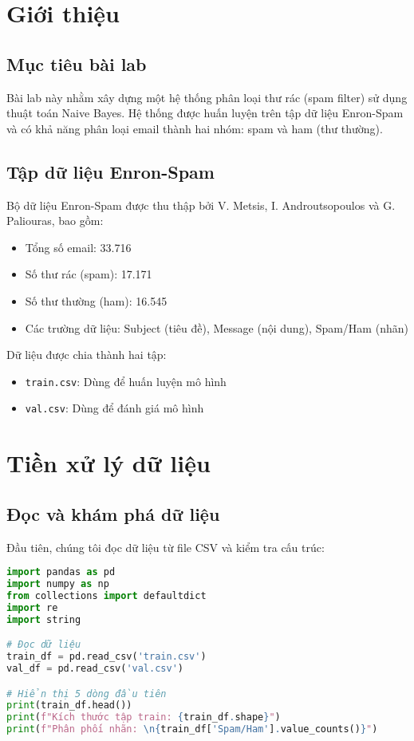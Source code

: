 \section{Giới thiệu}

\subsection{Mục tiêu bài lab}
Bài lab này nhằm xây dựng một hệ thống phân loại thư rác (spam filter) sử dụng thuật toán Naive Bayes. Hệ thống được huấn luyện trên tập dữ liệu Enron-Spam và có khả năng phân loại email thành hai nhóm: spam và ham (thư thường).

\subsection{Tập dữ liệu Enron-Spam}
Bộ dữ liệu Enron-Spam được thu thập bởi V. Metsis, I. Androutsopoulos và G. Paliouras, bao gồm:
\begin{itemize}
    \item Tổng số email: 33.716
    \item Số thư rác (spam): 17.171 
    \item Số thư thường (ham): 16.545
    \item Các trường dữ liệu: Subject (tiêu đề), Message (nội dung), Spam/Ham (nhãn)
\end{itemize}

Dữ liệu được chia thành hai tập:
\begin{itemize}
    \item \texttt{train.csv}: Dùng để huấn luyện mô hình
    \item \texttt{val.csv}: Dùng để đánh giá mô hình
\end{itemize}

\section{Tiền xử lý dữ liệu}

\subsection{Đọc và khám phá dữ liệu}
Đầu tiên, chúng tôi đọc dữ liệu từ file CSV và kiểm tra cấu trúc:

\begin{lstlisting}[language=Python]
import pandas as pd
import numpy as np
from collections import defaultdict
import re
import string

# Đọc dữ liệu
train_df = pd.read_csv('train.csv')
val_df = pd.read_csv('val.csv')

# Hiển thị 5 dòng đầu tiên
print(train_df.head())
print(f"Kích thước tập train: {train_df.shape}")
print(f"Phân phối nhãn: \n{train_df['Spam/Ham'].value_counts()}")
\end{lstlisting}

